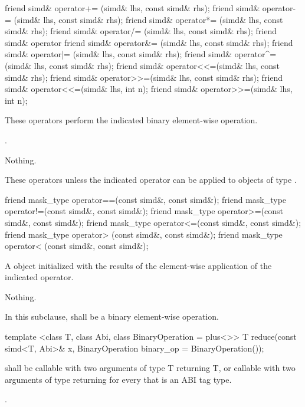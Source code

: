 \begin{itemdecl}
friend simd& operator+= (simd& lhs, const simd& rhs);
friend simd& operator-= (simd& lhs, const simd& rhs);
friend simd& operator*= (simd& lhs, const simd& rhs);
friend simd& operator/= (simd& lhs, const simd& rhs);
friend simd& operator%
friend simd& operator&= (simd& lhs, const simd& rhs);
friend simd& operator|= (simd& lhs, const simd& rhs);
friend simd& operator^= (simd& lhs, const simd& rhs);
friend simd& operator<<=(simd& lhs, const simd& rhs);
friend simd& operator>>=(simd& lhs, const simd& rhs);
friend simd& operator<<=(simd& lhs, int n);
friend simd& operator>>=(simd& lhs, int n);
\end{itemdecl}
\begin{itemdescr}
  \pnum\effects These operators perform the indicated binary element-wise operation.

  \pnum\returns {}.

  \pnum\throws Nothing.

  \pnum\remarks These operators \specialsfinae unless the indicated operator can be applied to objects of type .
\end{itemdescr}

\begin{itemdecl}
friend mask_type operator==(const simd&, const simd&);
friend mask_type operator!=(const simd&, const simd&);
friend mask_type operator>=(const simd&, const simd&);
friend mask_type operator<=(const simd&, const simd&);
friend mask_type operator> (const simd&, const simd&);
friend mask_type operator< (const simd&, const simd&);
\end{itemdecl}
\begin{itemdescr}
  \pnum\returns A \mask object initialized with the results of the element-wise application of the indicated operator.

  \pnum\throws Nothing.
\end{itemdescr}

\pnum In this subclause,  shall be a binary element-wise operation.

\begin{itemdecl}
template <class T, class Abi, class BinaryOperation = plus<>>
T reduce(const simd<T, Abi>& x, BinaryOperation binary_op = BinaryOperation());
\end{itemdecl}
\begin{itemdescr}
  \pnum\requires {} shall be callable with two arguments of type \type T returning \type T, or callable with two arguments of type \simd[<T, A1>] returning \simd[<T, A1>] for every  that is an ABI tag type.

  \pnum\returns {} \foralli.

  \pnum{}
\end{itemdescr}

